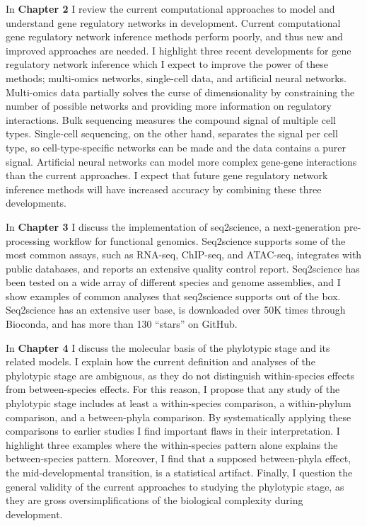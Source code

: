 In \textbf{Chapter 2} I review the current computational approaches to model and understand gene regulatory networks in development. Current computational gene regulatory network inference methods perform poorly, and thus new and improved approaches are needed. I highlight three recent developments for gene regulatory network inference which I expect to improve the power of these methods; multi-omics networks, single-cell data, and artificial neural networks. Multi-omics data partially solves the curse of dimensionality by constraining the number of possible networks and providing more information on regulatory interactions. Bulk sequencing measures the compound signal of multiple cell types. Single-cell sequencing, on the other hand, separates the signal per cell type, so cell-type-specific networks can be made and the data contains a purer signal. Artificial neural networks can model more complex gene-gene interactions than the current approaches. I expect that future gene regulatory network inference methods will have increased accuracy by combining these three developments.

In \textbf{Chapter 3} I discuss the implementation of seq2science, a next-generation pre-processing workflow for functional genomics. Seq2science supports some of the most common assays, such as RNA-seq, ChIP-seq, and ATAC-seq, integrates with public databases, and reports an extensive quality control report. Seq2science has been tested on a wide array of different species and genome assemblies, and I show examples of common analyses that seq2science supports out of the box. Seq2science has an extensive user base\cite{Bright_2021,Xu_2020,Wester2021,SantosBarriopedro2021,Heuts2023,Tholen2023,Harlaar2022,LunaVelez2023,Neikes2023,Vierboom2021,Smits2020,Smits2022,Heuts2022,Rother2023,Ho2023,Sweep2023,vanWigcheren2023,Smits2023,Vattulainen2023}, is downloaded over 50K times through Bioconda, and has more than 130 ``stars'' on GitHub.

In \textbf{Chapter 4} I discuss the molecular basis of the phylotypic stage and its related models. I explain how the current definition and analyses of the phylotypic stage are ambiguous, as they do not distinguish within-species effects from between-species effects. For this reason, I propose that any study of the phylotypic stage includes at least a within-species comparison, a within-phylum comparison, and a between-phyla comparison. By systematically applying these comparisons to earlier studies I find important flaws in their interpretation. I highlight three examples where the within-species pattern alone explains the between-species pattern. Moreover, I find that a supposed between-phyla effect, the mid-developmental transition, is a statistical artifact. Finally, I question the general validity of the current approaches to studying the phylotypic stage, as they are gross oversimplifications of the biological complexity during development.

